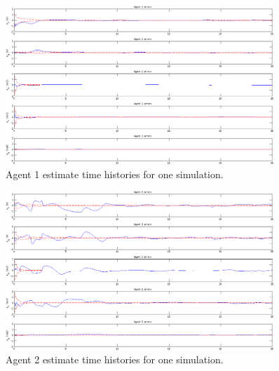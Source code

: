\documentclass{aiaa-tc}
\begin{document}
\begin{figure}[tb!]
\centering
\includegraphics[width=0.9\textwidth]{agent1_est.png}
\caption{ Agent 1 estimate time histories for one simulation. }
\label{fig:agent1_est}
\end{figure}

\begin{figure}[tb!]
\centering
\includegraphics[width=0.9\textwidth]{agent2_est.png}
\caption{Agent 2 estimate time histories for one simulation.}
\label{fig:agent2_est}
\end{figure}
\end{document}
